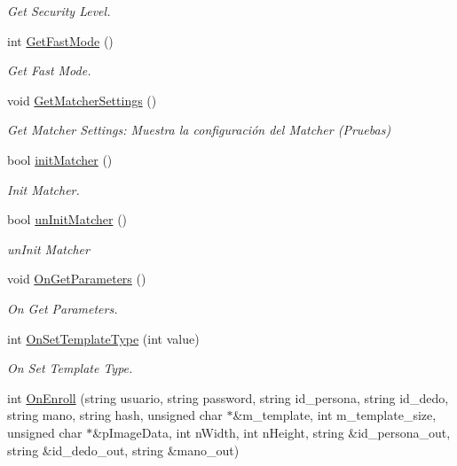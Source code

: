\begin{DoxyCompactItemize}
\begin{DoxyCompactList}\small\item\em Get Security Level. \end{DoxyCompactList}\item 
int \hyperlink{classTemplateAFIS__webservice_a4842d911ed73f5c33bf5150a6e3bcad4}{Get\+Fast\+Mode} ()
\begin{DoxyCompactList}\small\item\em Get Fast Mode. \end{DoxyCompactList}\item 
void \hyperlink{classTemplateAFIS__webservice_ac6ac32ddd0df850b0e25aa0943c39113}{Get\+Matcher\+Settings} ()
\begin{DoxyCompactList}\small\item\em Get Matcher Settings\+: Muestra la configuración del Matcher (Pruebas) \end{DoxyCompactList}\item 
bool \hyperlink{classTemplateAFIS__webservice_a8698c0f638f3be26a0664edd56038847}{init\+Matcher} ()
\begin{DoxyCompactList}\small\item\em Init Matcher. \end{DoxyCompactList}\item 
bool \hyperlink{classTemplateAFIS__webservice_a90522f2c2f10ae8fa3ab6abd0273b714}{un\+Init\+Matcher} ()
\begin{DoxyCompactList}\small\item\em un\+Init Matcher \end{DoxyCompactList}\item 
void \hyperlink{classTemplateAFIS__webservice_a40bd372e1a5b01d9bc2b4e1898be967f}{On\+Get\+Parameters} ()
\begin{DoxyCompactList}\small\item\em On Get Parameters. \end{DoxyCompactList}\item 
int \hyperlink{classTemplateAFIS__webservice_aa89af892ebe892d1a92f1e2dad5e998d}{On\+Set\+Template\+Type} (int value)
\begin{DoxyCompactList}\small\item\em On Set Template Type. \end{DoxyCompactList}\item 
int \hyperlink{classTemplateAFIS__webservice_a5fc2884ea75075e40a6056440021f27d}{On\+Enroll} (string usuario, string password, string id\+\_\+persona, string id\+\_\+dedo, string mano, string hash, unsigned char $\ast$\&m\+\_\+template, int m\+\_\+template\+\_\+size, unsigned char $\ast$\&p\+Image\+Data, int n\+Width, int n\+Height, string \&id\+\_\+persona\+\_\+out, string \&id\+\_\+dedo\+\_\+out, string \&mano\+\_\+out)

\end{DoxyCompactItemize}
